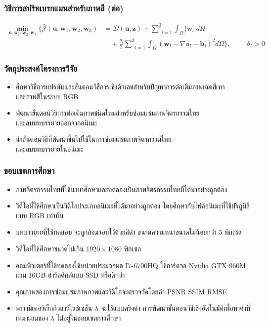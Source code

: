 \documentclass[xcolor=dvipsnames, xetex,serif]{beamer}
\numberwithin{equation}{section}
\begin{document}
		\begin{frame}
			\frametitle{วิธีการสปริทเบรกแมนสำหรับภาพสี (ต่อ)}
			\begin{align*}
			\min_{\boldsymbol{u},\boldsymbol{w}_1,\boldsymbol{w}_2,\boldsymbol{w}_3} \{\bar{\mathcal{J}}(\boldsymbol{u},\boldsymbol{w}_1,\boldsymbol{w}_2,\boldsymbol{w}_3)&= \mathcal{\bar{D}}(\boldsymbol{u},\boldsymbol{z}) +  \underset{l=1}{\overset{3}{\sum}} \int_{\Omega}^{}|\boldsymbol{w}_l|d\Omega
			\nonumber\\
			&\quad+ \frac{\theta_l}{2} \underset{l=1}{\overset{3}{\sum}}\int_{\Omega}^{}(\boldsymbol{w}_l - \nabla u_l - \boldsymbol{b_l})^{2}d\Omega\}, \hspace{1cm} \theta_l > 0
			\end{align*}
		\end{frame}
		\begin{frame}
			\frametitle{วัตถุประสงค์โครงการวิจัย}
			\begin{itemize}
				\item ศึกษาวิธีการแปรผันและขั้นตอนวิธีการเชิงตัวเลขสำหรับปัญหาการต่อเติมภาพเฉดสีเทา\\และภาพสีในระบบ RGB
				\item พัฒนาขั้นตอนวิธีการต่อเติมภาพชนิดใหม่สำหรับซ่อมแซมภาพจิตรกรรมไทย\\และลบบทบรรยายออกจากอนิเมะ
				\item นำขั้นตอนวิธีที่พัฒนาขึ้นไปใช้ในการซ่อมแซมภาพจิตรกรรมไทย\\และลบบทบรรยายในอนิเมะ
			\end{itemize}
		\end{frame}
		\begin{frame}
			\frametitle{ขอบเขตการศึกษา}
			\begin{itemize}
				\item ภาพจิตรกรรมไทยที่ใช้นำมาศึกษาและทดลองเป็นภาพจิตรกรรมไทยที่ได้มาอย่างถูกต้อง
				\item วิดีโอที่ใช้ศึกษาเป็นวิดีโอประเภทอนิเมะที่ได้มาอย่างถูกต้อง โดยศึกษากับไฟล์อนิเมะที่ใช้ปริภูมิสีแบบ RGB เท่านั้น
				\item บทบรรยายที่ใช้ทดสอบ จะถูกล้อมรอบไว้ด้วยสีดำ ขนาดความหนาขนาดไม่น้อยกว่า 5 พิกเซล
				\item วิดีโอที่ใช้ศึกษาขนาดไม่เกิน $1920\times1080$ พิกเซล
				\item คอมพิวเตอร์ที่ใช้ทดลองใช้หน่วยประมวลผล I7-6700HQ ใช้การ์ดจอ Nvidia GTX 960M แรม 16GB ฮาร์ดดิกส์แบบ SSD หรือดีกว่า
				\item คุณภาพของการซ่อมแซมภาพภาพและวิดีโอจะตรวจวัดโดยค่า PSNR SSIM RMSE 
				\item พารามิเตอร์เร็กกิวลาร์ไรซ์เซชัน $\lambda$ จะใช้แบบตรึงค่า การพัฒนาขั้นตอนวิธีเชิงอัตโนมัติเพื่อหาค่าที่เหมาะสมของ $\lambda$ ไม่อยู่ในขอบเขตการศึกษา
			\end{itemize}
		\end{frame}
\end{document}
